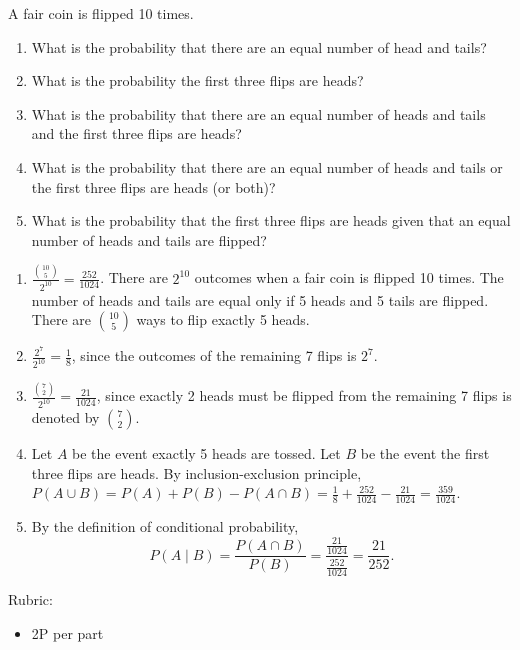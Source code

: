 \documentclass{article}
\theoremstyle{definition}
\begin{document}
\begin{question}
        A fair coin is flipped 10 times.
    \begin{enumerate}
        \item What is the probability that there are an equal number of head and
            tails?
        \item What is the probability the first three flips are heads?
        \item What is the probability that there are an equal number of heads
            and tails and the first three flips are heads?
        \item What is the probability that there are an equal number of heads
            and tails or the first three flips are heads (or both)?
        \item What is the probability that the first three flips are heads given
            that an equal number of heads and tails are flipped?
    \end{enumerate}
\end{question}
\begin{solution}
    \begin{enumerate}
        \item $\frac{\binom{10}{5}}{2^{10}} = \frac{252}{1024}$.  There are
            $2^{10}$ outcomes when a fair coin is flipped 10 times.  The number
            of heads and tails are equal only if 5 heads and 5 tails are
            flipped.  There are $\binom{10}{5}$ ways to flip exactly 5 heads.
        \item $\frac{2^7}{2^{10}} = \frac{1}{8}$, since the outcomes of the
            remaining 7 flips is $2^7$.
        \item $\frac{\binom{7}{2}}{2^{10}} = \frac{21}{1024}$, since exactly 2
            heads must be flipped from the remaining 7 flips is denoted by
        $\binom{7}{2}$.
        \item Let $A$ be the event exactly 5 heads are tossed.  Let $B$ be the
            event the first three flips are heads.  By inclusion-exclusion
            principle, $P(A\cup B) = P(A) + P(B) - P(A\cap B)= \frac{1}{8} +
            \frac{252}{1024} - \frac{21}{1024} = \frac{359}{1024}$.
        \item By the definition of conditional probability,
        \[
            P(A \mid B) = \frac{P(A \cap B)}{P(B)} = \frac{\frac{21}{1024}}{\frac{252}{1024}} =
                \frac{21}{252}.
        \]
    \end{enumerate}
   
   {\color{red} Rubric:
\begin{itemize}
\item 2P per part
\end{itemize}}
\end{solution}
\end{document}
